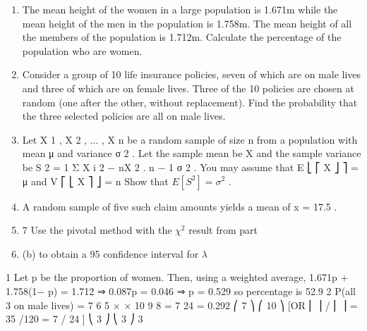 \documentclass[a4paper,12pt]{article}
\begin{document}
\begin{enumerate}

\item The mean height of the women in a large population is 1.671m while the mean height of the men in the population is 1.758m. The mean height of all the members of the population is 1.712m.
Calculate the percentage of the population who are women.

\item 
Consider a group of 10 life insurance policies, seven of which are on male lives and three of which are on female lives. Three of the 10 policies are chosen at random (one after the other, without replacement).
Find the probability that the three selected policies are all on male lives.

\item 
Let X 1 , X 2 , ... , X n be a random sample of size n from a population with mean μ and
variance σ 2 .
Let the sample mean be X and the sample variance be S 2 =
1
{ Σ X i 2 − nX 2 } .
n − 1
σ 2
.
You may assume that E ⎣ ⎡ X ⎦ ⎤ = μ and V ⎡ ⎣ X ⎤ ⎦ =
n
Show that $E [ S^2 ] = \sigma^2$ .
\item 
A random sample of five such claim amounts yields a mean of x = 17.5 .
\item 
7
Use the pivotal method with the $\chi^2$ result from part \item (b) to obtain a 95%
confidence interval for $\lambda$
\end{enumerate}
\newpage



1
Let p be the proportion of women.
Then, using a weighted average, 1.671p + 1.758(1− p) = 1.712
⇒ 0.087p = 0.046 ⇒ p = 0.529 so percentage is 52.9%
2
P(all 3 on male lives) =
7 6 5
× ×
10 9 8
=
7
24
= 0.292
⎛ 7 ⎞ ⎛ 10 ⎞
[OR ⎜ ⎟ / ⎜ ⎟ = 35 /120 = 7 / 24 ]
⎝ 3 ⎠ ⎝ 3 ⎠
3
\end{document}
